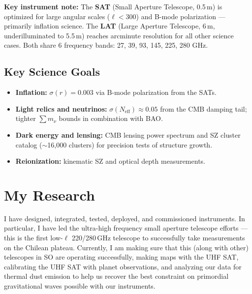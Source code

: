 \documentclass[12pt]{article}
\begin{document}
\noindent\textbf{Key instrument note:} The \textbf{SAT} (Small Aperture Telescope, 0.5\,m) is optimized for large angular scales ($\ell < 300$) and B-mode polarization --- primarily inflation science. The \textbf{LAT} (Large Aperture Telescope, 6\,m, underilluminated to 5.5\,m) reaches arcminute resolution for all other science cases. Both share 6 frequency bands: 27, 39, 93, 145, 225, 280 GHz.

\subsection*{Key Science Goals \cite{Ade2019}}

\begin{itemize}
  \item \textbf{Inflation:} $\sigma(r) = 0.003$ via B-mode polarization from the SATs.
  \item \textbf{Light relics and neutrinos:} $\sigma(N_\mathrm{eff}) \approx 0.05$ from the CMB damping tail; tighter $\sum m_\nu$ bounds in combination with BAO.
  \item \textbf{Dark energy and lensing:} CMB lensing power spectrum and SZ cluster catalog ($\sim$16,000 clusters) for precision tests of structure growth.
  \item \textbf{Reionization:} kinematic SZ and optical depth measurements.
\end{itemize}

\section{My Research}
\label{sec:research}

I have designed, integrated, tested, deployed, and commissioned instruments. In particular, I have led the ultra-high frequency small aperture telescope efforts --- this is the first low-$\ell$ 220/280\,GHz telescope to successfully take measurements on the Chilean plateau. Currently, I am making sure that this (along with other) telescopes in SO are operating successfully, making maps with the UHF SAT, calibrating the UHF SAT with planet observations, and analyzing our data for thermal dust emission to help us recover the best constraint on primordial gravitational waves possible with our instruments.

\end{document}
